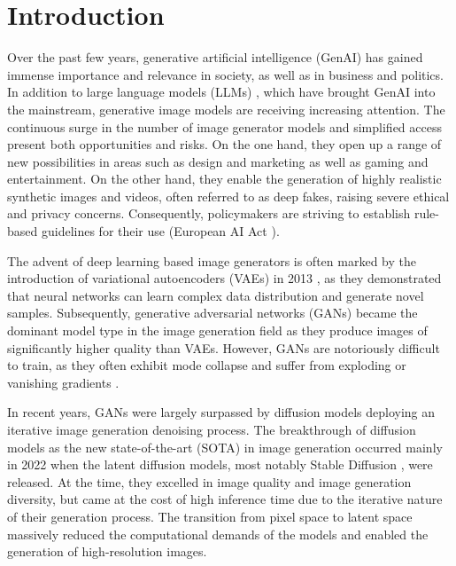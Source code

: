 \chapter{Introduction}
Over the past few years, generative artificial intelligence (\gls{GenAI})  has gained immense importance and relevance in society, as well as in business and politics. In addition to large language models (\gls{LLM}s) \cite{Claude,GPT4,Gemini,Lama}, which have brought \gls{GenAI} into the mainstream, generative image models \cite{Flux,Pixart_s,baldridge2024imagen,brooks2024video,SD21,SDXL} are receiving increasing attention. The continuous surge in the number of image generator models and simplified access present both opportunities and risks. On the one hand, they open up a range of new possibilities in areas such as design and marketing as well as gaming and entertainment. On the other hand, they enable the generation of highly realistic synthetic images and videos, often referred to as deep fakes, raising severe ethical and privacy concerns. Consequently, policymakers are striving to establish rule-based guidelines for their use (European AI Act \cite{eu_ai_act_2024}). 

The advent of deep learning based image generators is often marked by the introduction of variational autoencoders (\gls{VAE}s) in 2013 \cite{VAE}, as they demonstrated that neural networks can learn complex data distribution and generate novel samples. Subsequently, generative adversarial networks (\gls{GAN}s) \cite{GAN,StyleGAN_3,StyleGAN_T} became the dominant model type in the image generation field as they produce images of significantly higher quality than \gls{VAE}s. However, \gls{GAN}s are notoriously difficult to train, as they often exhibit mode collapse and suffer from exploding or vanishing gradients \cite{ModeCollapse1,ImprovedGANTraining, PacGAN}.

 In recent years, \gls{GAN}s were largely surpassed by diffusion models \cite{DDPM} deploying an iterative image generation denoising process. The breakthrough of diffusion models as the new state-of-the-art (\gls{SOTA}) in image generation occurred mainly in 2022 when the latent diffusion models, most notably Stable Diffusion \cite{LDM}, were released. At the time, they excelled in image quality and image generation diversity, but came at the cost of high inference time due to the iterative nature of their generation process. The transition from pixel space to latent space massively reduced the computational demands of the models and enabled the generation of high-resolution images.
 
